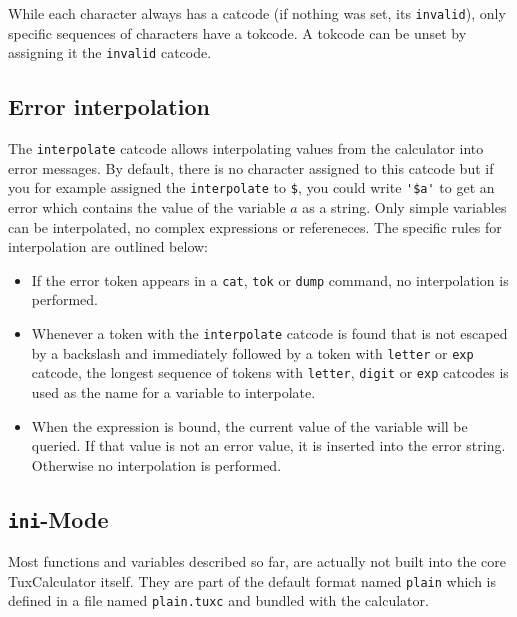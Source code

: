 \documentclass[10pt]{article}
\begin{document}
    While each character always has a catcode (if nothing was set, its \verb|invalid|), only specific sequences of characters have a tokcode.
    A tokcode can be unset by assigning it the \verb|invalid| catcode.

    \subsection{Error interpolation}\label{subsec:errinterp}
    The \verb|interpolate| catcode allows interpolating values from the calculator into error messages.
    By default, there is no character assigned to this catcode but if you for example assigned the \verb|interpolate| to \verb|$|, you could write \verb|'$a'| to get an error which contains the value of the variable $ a $ as a string.
    Only simple variables can be interpolated, no complex expressions or refereneces.
    The specific rules for interpolation are outlined below:
    \begin{itemize}
        \item If the error token appears in a \verb|cat|, \verb|tok| or \verb|dump| command, no interpolation is performed.
        \item Whenever a token with the \verb|interpolate| catcode is found that is not escaped by a backslash and immediately followed by a token with \verb|letter| or \verb|exp| catcode, the longest sequence of tokens with \verb|letter|, \verb|digit| or \verb|exp| catcodes is used as the name for a variable to interpolate.
        \item When the expression is bound, the current value of the variable will be queried.
              If that value is not an error value, it is inserted into the error string.
              Otherwise no interpolation is performed.
    \end{itemize}
    
    \subsection{\texttt{ini}-Mode}\label{subsec:inimode}
    Most functions and variables described so far, are actually not built into the core TuxCalculator itself.
    They are part of the default format named \verb|plain| which is defined in a file named \verb|plain.tuxc| and bundled with the calculator.
    
\end{document}
